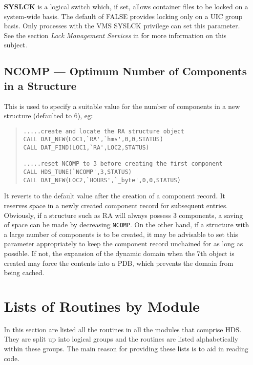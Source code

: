{\bf SYSLCK} is a logical switch which, if set, allows container files to be
locked on a system-wide basis. The default of FALSE provides locking only on a
UIC group basis. Only processes with the VMS SYSLCK privilege can set this
parameter. See the section {\em Lock Management Services} in
\cite{system_services_reference} for more information on this subject.

\subsection {NCOMP --- Optimum Number of Components in a Structure}

This is used to specify a suitable value for the number of components in a new
structure (defaulted to 6), eg:

\begin {quote}
\begin {verbatim}
.....create and locate the RA structure object
CALL DAT_NEW(LOC1,`RA',`hms',0,0,STATUS)
CALL DAT_FIND(LOC1,`RA',LOC2,STATUS)

.....reset NCOMP to 3 before creating the first component
CALL HDS_TUNE(`NCOMP',3,STATUS)
CALL DAT_NEW(LOC2,`HOURS',`_byte',0,0,STATUS)
\end{verbatim}
\end {quote}

It reverts to the default value after the creation of a component record. It
reserves space in a newly created component record for subsequent entries.
Obviously, if a structure such as RA will always possess 3 components, a saving
of space can be made by decreasing {\tt NCOMP}. On the other hand, if a
structure with a large number of components is to be created, it may be
advisable to set this parameter appropriately to keep the component record
unchained for as long as possible. If not, the expansion of the dynamic domain
when the 7th object is created may force the contents into a PDB, which
prevents the domain from being cached.

\appendix

\clearpage
\section {Lists of Routines by Module}
\label {routine_lists}

In this section are listed all the routines in all the modules that comprise
HDS. They are split up into logical groups and the routines are listed
alphabetically within these groups. The main reason for providing these lists
is to aid in reading code.

